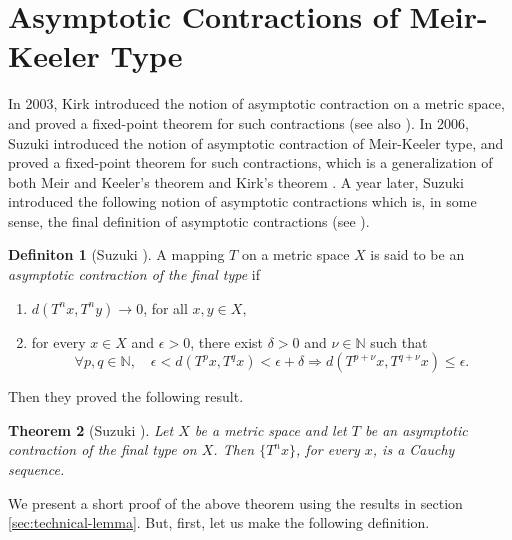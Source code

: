 \documentclass[a4paper,10pt,twoside,reqno]{amsart}
\newtheorem{thm}{Theorem}[section]
\theoremstyle{definition}
\newtheorem{dfn}[thm]{Definiton}
\theoremstyle{remark}
\newcommand{\de}{\delta}
\newcommand{\e}{\epsilon}
\newcommand{\N}{\mathbb{N}}
\numberwithin{equation}{section}
\begin{document}
\bigskip

\section{Asymptotic Contractions of Meir-Keeler Type}
\label{sec:asymptotic-contractions}

In 2003, Kirk \cite{Kirk-2003} introduced the notion of asymptotic contraction
on a metric space, and proved a fixed-point theorem for such contractions
(see also \cite{Arandelovic-2005}). In 2006, Suzuki \cite{Suzuki-AC-2006}
introduced the notion of asymptotic contraction
of Meir-Keeler type, and proved a fixed-point theorem for such contractions, which is
a generalization of both Meir and Keeler's theorem \cite{Meir-Keeler-1969}
and Kirk's theorem \cite{Kirk-2003}. A year later, Suzuki \cite{Suzuki-AC-2007}
introduced the following notion of asymptotic contractions which is, in some sense, the final
definition of asymptotic contractions (see \cite[Theorem 6]{Suzuki-AC-2007}).

\begin{dfn}[Suzuki \cite{Suzuki-AC-2007}]
\label{dfn:ACF}
  A mapping $T$ on a metric space $X$ is said to be an
  \emph{asymptotic contraction of the final type} if
  \begin{enumerate}[\upshape(i)]
    \item $d(T^nx,T^ny)\to0$, for all $x,y\in X$,

    \item for every $x\in X$ and $\e>0$, there exist $\de>0$ and $\nu\in\N$ such that
    \begin{equation*}
      \forall p,q\in\N, \quad
      \e<d(T^p x,T^q x) < \e+\de \Longrightarrow
      d(T^{p+\nu} x,T^{q+\nu} x) \leq \e.
    \end{equation*}

  \end{enumerate}
\end{dfn}

Then they proved the following result.

\begin{thm}[Suzuki \cite{Suzuki-AC-2007}]
\label{thm:Suzuki-AC-Cauchy}
  Let $X$ be a metric space and let $T$ be an asymptotic contraction of the final type
  on $X$. Then $\{T^nx\}$, for every $x$, is a Cauchy sequence.
\end{thm}

We present a short proof of the above theorem using the results in section \ref{sec:technical-lemma}.
But, first, let us make the following definition.
\end{document}
